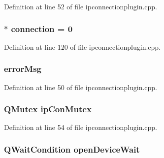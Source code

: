 \-Definition at line 52 of file ipconnectionplugin.\-cpp.

\hypertarget{group___i_p_conn_plugin_ga75cb9b33b52928c030806876f2c2f439}{
\subsubsection[{connection}]{$\ast$ {\bf connection} = 0}}\label{group___i_p_conn_plugin_ga75cb9b33b52928c030806876f2c2f439}


\-Definition at line 120 of file ipconnectionplugin.\-cpp.

\hypertarget{group___i_p_conn_plugin_ga2146099b9930944186a7ecc208950d22}{
\subsubsection[{error\-Msg}]{ {\bf error\-Msg}}}\label{group___i_p_conn_plugin_ga2146099b9930944186a7ecc208950d22}


\-Definition at line 50 of file ipconnectionplugin.\-cpp.

\hypertarget{group___i_p_conn_plugin_gae78cf6a3d1073c22be5cc8054ae1e8d6}{
\subsubsection[{ip\-Con\-Mutex}]{\setlength{\rightskip}{0pt plus 5cm}\-Q\-Mutex {\bf ip\-Con\-Mutex}}}\label{group___i_p_conn_plugin_gae78cf6a3d1073c22be5cc8054ae1e8d6}


\-Definition at line 54 of file ipconnectionplugin.\-cpp.

\hypertarget{group___i_p_conn_plugin_ga1724de889bbf979017a390aae2554bbd}{
\subsubsection[{open\-Device\-Wait}]{\setlength{\rightskip}{0pt plus 5cm}\-Q\-Wait\-Condition {\bf open\-Device\-Wait}}}\label{group___i_p_conn_plugin_ga1724de889bbf979017a390aae2554bbd}


